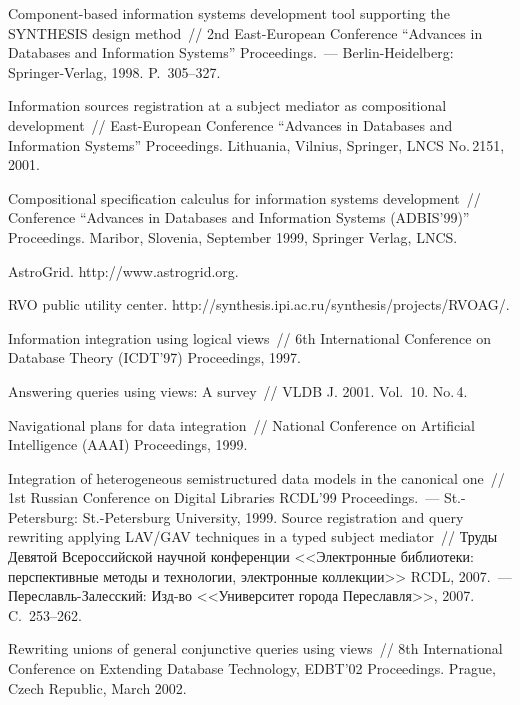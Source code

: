 \begin{multicols}{2}
{{\begin{thebibliography}{99}
Component-based information systems development tool supporting the SYNTHESIS design
method~// 2nd East-European Conference ``Advances in Databases and Information Systems''
Proceedings.~---  Berlin-Heidelberg: Springer-Verlag, 1998.  P.~305--327.

Information sources registration at a subject mediator as compositional development~//
East-European Conference ``Advances in Databases and Information Systems'' Proceedings.
Lithuania, Vilnius, Springer, LNCS No.\,2151, 2001.

Compositional specification calculus for information systems development~// Conference
``Advances in Databases and Information Systems \mbox{(ADBIS'99)}'' Proceedings. Maribor,
Slovenia, September 1999, Springer Verlag, LNCS.

AstroGrid. {\sf http://www.astrogrid.org}.

RVO public utility center. {\sf http://synthesis.ipi.ac.ru/\linebreak synthesis/projects/RVOAG/}.

Information integration using logical views~//
6th International Conference on Database Theory (ICDT'97) Proceedings, 1997.

Answering queries using views: A survey~// VLDB J. 2001. Vol.~10. No.\,4.

Navigational plans for data integration~// National Conference on Artificial Intelligence (AAAI)
Proceedings, 1999.

Integration of heterogeneous semistructured data models in the canonical one~//
1st Russian Conference on Digital Libraries RCDL'99 Proceedings.~--- St.-Petersburg:
St.-Petersburg University, 1999.
Source registration and query rewriting applying LAV/GAV techniques in a typed subject
mediator~// Труды Девятой Всероссийской научной конференции <<Электронные
библиотеки: перспективные методы и технологии, электронные коллекции>> RCDL,
2007.~--- Переславль-Залесский: Изд-во <<Университет города Переславля>>, 2007.
C.~253--262.

Rewriting unions of general conjunctive queries using views~//
8th International Conference on Extending Database Technology, EDBT'02 Proceedings.
Prague, Czech Republic, March 2002.


\end{thebibliography}}}
\end{multicols}
